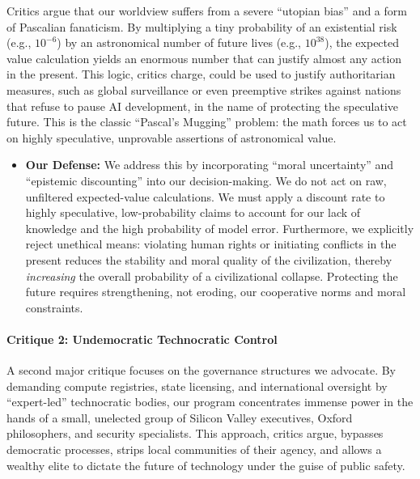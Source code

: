 Critics argue that our worldview suffers from a severe ``utopian bias''
and a form of Pascalian fanaticism. By multiplying a tiny probability of
an existential risk (e.g., \(10^{-6}\)) by an astronomical number of
future lives (e.g., \(10^{38}\)), the expected value calculation yields
an enormous number that can justify almost any action in the present.
This logic, critics charge, could be used to justify authoritarian
measures, such as global surveillance or even preemptive strikes against
nations that refuse to pause AI development, in the name of protecting
the speculative future. This is the classic ``Pascal's Mugging''
problem: the math forces us to act on highly speculative, unprovable
assertions of astronomical value.

\begin{itemize}
\tightlist
\item
  \textbf{Our Defense:} We address this by incorporating ``moral
  uncertainty'' and ``epistemic discounting'' into our decision-making.
  We do not act on raw, unfiltered expected-value calculations. We must
  apply a discount rate to highly speculative, low-probability claims to
  account for our lack of knowledge and the high probability of model
  error. Furthermore, we explicitly reject unethical means: violating
  human rights or initiating conflicts in the present reduces the
  stability and moral quality of the civilization, thereby
  \emph{increasing} the overall probability of a civilizational
  collapse. Protecting the future requires strengthening, not eroding,
  our cooperative norms and moral constraints.
\end{itemize}

\paragraph{Critique 2: Undemocratic Technocratic
Control}\label{critique-2-undemocratic-technocratic-control}

A second major critique focuses on the governance structures we
advocate. By demanding compute registries, state licensing, and
international oversight by ``expert-led'' technocratic bodies, our
program concentrates immense power in the hands of a small, unelected
group of Silicon Valley executives, Oxford philosophers, and security
specialists. This approach, critics argue, bypasses democratic
processes, strips local communities of their agency, and allows a
wealthy elite to dictate the future of technology under the guise of
public safety.

